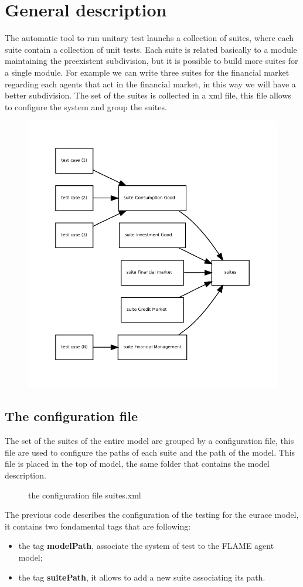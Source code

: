 \documentclass[a4paper,10pt]{article}
\begin{document}
\section{General description}
The automatic tool to run unitary test launchs a collection of suites, 
where each suite contain a collection of unit tests. 
Each suite is related basically to a module maintaining the preexistent subdivision, but it is possible to build more suites  for a single module. For example we can write three suites for the financial market regarding each agents that act in the financial market, in this way we will have a better subdivision. The set of the suites is collected in a xml file, this file allows to configure the system and group the suites.   
\begin{figure}
\centering
\includegraphics[scale=0.9]{graph/suites} 
\end{figure}
\subsection{The configuration file}
The set of the suites of the entire model are grouped by a configuration file, this file are used to configure the paths of each suite and the path of the model. This file is placed in the top of model, the same folder that contains the model description.
\begin{figure}
\label{fig:fig2}

\caption{the configuration file suites.xml}
\end{figure} 
The previous code describes the configuration of the testing for the eurace model, it contains two fondamental tags that are following:
\begin{itemize}
\item the tag \textbf{modelPath}, associate the system of test to the FLAME agent model;
\item the tag \textbf{suitePath}, it allows to add a new suite associating its path.
\end{itemize}
\end{document}
